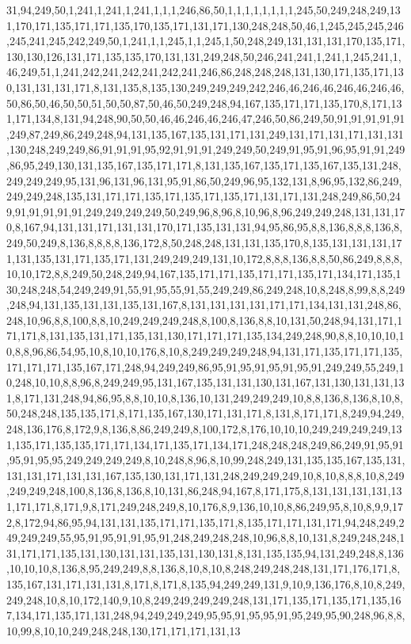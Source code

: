 31,94,249,50,1,241,1,241,1,241,1,1,1,246,86,50,1,1,1,1,1,1,1,1,245,50,249,248,249,131,170,171,135,171,171,135,170,135,171,131,171,130,248,248,50,46,1,245,245,245,246,245,241,245,242,249,50,1,241,1,1,245,1,1,245,1,50,248,249,131,131,131,170,135,171,130,130,126,131,171,135,135,170,131,131,249,248,50,246,241,241,1,241,1,245,241,1,46,249,51,1,241,242,241,242,241,242,241,246,86,248,248,248,131,130,171,135,171,130,131,131,131,171,8,131,135,8,135,130,249,249,249,242,246,46,246,46,246,46,246,46,50,86,50,46,50,50,51,50,50,87,50,46,50,249,248,94,167,135,171,171,135,170,8,171,131,171,134,8,131,94,248,90,50,50,46,46,246,46,246,47,246,50,86,249,50,91,91,91,91,91,249,87,249,86,249,248,94,131,135,167,135,131,171,131,249,131,171,131,171,131,131,130,248,249,249,86,91,91,91,95,92,91,91,91,249,249,50,249,91,95,91,96,95,91,91,249,86,95,249,130,131,135,167,135,171,171,8,131,135,167,135,171,135,167,135,131,248,249,249,249,95,131,96,131,96,131,95,91,86,50,249,96,95,132,131,8,96,95,132,86,249,249,249,248,135,131,171,171,135,171,135,171,135,171,131,171,131,248,249,86,50,249,91,91,91,91,91,249,249,249,249,50,249,96,8,96,8,10,96,8,96,249,249,248,131,131,170,8,167,94,131,131,171,131,131,170,171,135,131,131,94,95,86,95,8,8,136,8,8,8,136,8,249,50,249,8,136,8,8,8,8,136,172,8,50,248,248,131,131,135,170,8,135,131,131,131,171,131,135,131,171,135,171,131,249,249,249,131,10,172,8,8,8,136,8,8,50,86,249,8,8,8,10,10,172,8,8,249,50,248,249,94,167,135,171,171,135,171,171,135,171,134,171,135,130,248,248,54,249,249,91,55,91,95,55,91,55,249,249,86,249,248,10,8,248,8,99,8,8,249,248,94,131,135,131,131,135,131,167,8,131,131,131,131,171,171,134,131,131,248,86,248,10,96,8,8,100,8,8,10,249,249,249,248,8,100,8,136,8,8,10,131,50,248,94,131,171,171,171,8,131,135,131,171,135,131,130,171,171,171,135,134,249,248,90,8,8,10,10,10,10,8,8,96,86,54,95,10,8,10,10,176,8,10,8,249,249,249,248,94,131,171,135,171,171,135,171,171,171,135,167,171,248,94,249,249,86,95,91,95,91,95,91,95,91,249,249,55,249,10,248,10,10,8,8,96,8,249,249,95,131,167,135,131,131,130,131,167,131,130,131,131,131,8,171,131,248,94,86,95,8,8,10,10,8,136,10,131,249,249,249,10,8,8,136,8,136,8,10,8,50,248,248,135,135,171,8,171,135,167,130,171,131,171,8,131,8,171,171,8,249,94,249,248,136,176,8,172,9,8,136,8,86,249,249,8,100,172,8,176,10,10,10,249,249,249,249,131,135,171,135,135,171,171,134,171,135,171,134,171,248,248,248,249,86,249,91,95,91,95,91,95,95,249,249,249,249,8,10,248,8,96,8,10,99,248,249,131,135,135,167,135,131,131,131,171,131,131,167,135,130,131,171,131,248,249,249,249,10,8,10,8,8,8,10,8,249,249,249,248,100,8,136,8,136,8,10,131,86,248,94,167,8,171,175,8,131,131,131,131,131,171,171,8,171,9,8,171,249,248,249,8,10,176,8,9,136,10,10,8,86,249,95,8,10,8,9,9,172,8,172,94,86,95,94,131,131,135,171,171,135,171,8,135,171,171,131,171,94,248,249,249,249,249,55,95,91,95,91,91,95,91,248,249,248,248,10,96,8,8,10,131,8,249,248,248,131,171,171,135,131,130,131,131,135,131,130,131,8,131,135,135,94,131,249,248,8,136,10,10,10,8,136,8,95,249,249,8,8,136,8,10,8,10,8,248,249,248,248,131,171,176,171,8,135,167,131,171,131,131,8,171,8,171,8,135,94,249,249,131,9,10,9,136,176,8,10,8,249,249,248,10,8,10,172,140,9,10,8,249,249,249,249,248,131,171,135,171,135,171,135,167,134,171,135,171,131,248,94,249,249,249,95,95,91,95,95,91,95,249,95,90,248,96,8,8,10,99,8,10,10,249,248,248,130,171,171,171,131,13
